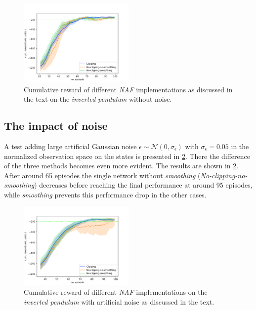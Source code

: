 \documentclass[
reprint,
amsmath,amssymb,amsfonts,clevref,
aps,
prstab,
]{revtex4-2}
\begin{document}
\begin{figure}[!h]
\centering
\includegraphics*[width=0.5\textwidth]{Figures/Comparison_naf}
\caption{Cumulative reward of different \emph{NAF} implementations as discussed in the text on the \emph{inverted pendulum} without noise.}
\label{fig:comparsion_smoothing_small}
\end{figure}





\subsection{The impact of noise}\label{appendix:The impact of noise}
A test adding large artificial Gaussian noise $\epsilon \sim \mathcal{N}(0, \sigma_\epsilon)$ with $\sigma_\epsilon=0.05$ in the normalized observation space on the states is presented in \cref{fig:comparsion_noise}. There the difference of the three methods becomes even more evident. The results are shown in \cref{fig:comparsion_noise}. After around 65 episodes the single network without \emph{smoothing} (\emph{No-clipping-no-smoothing}) decreases before reaching the final performance at around 95 episodes, while  \emph{smoothing} prevents this performance drop in the other cases. 
\begin{figure}
	\centering
	\includegraphics*[width=0.5\textwidth]{Figures/Comparison_noise}
	\caption{Cumulative reward of different \emph{NAF} implementations on the \emph{inverted pendulum} with artificial noise as discussed in the text.}
	\label{fig:comparsion_noise}
\end{figure}
\end{document}
